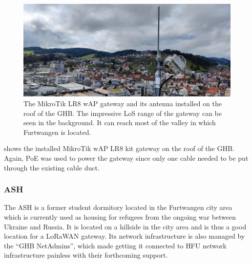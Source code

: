 \begin{figure}[htbp]
    \centering
    \includegraphics[width=1\textwidth]{pictures/hardware/gateway-deployment/lr8_ghb_installation.jpg}
    \caption{
        The MikroTik LR8 wAP gateway and its antenna installed on the roof of the \ac{GHB}.
        The impressive \ac{LoS} range of the gateway can be seen in the background.
        It can reach most of the valley in which Furtwangen is located.
    }\label{pic:mikrotik-gateway-ghb-installation}
\end{figure}

 shows the installed MikroTik wAP LR8 kit gateway on the roof of the \ac{GHB}.
Again, \ac{PoE} was used to power the gateway since only one cable needed to be put through the existing cable duct.

\subsubsection{\acf{ASH}}

The \ac{ASH} is a former student dormitory located in the Furtwangen city area which is currently used as housing for refugees from the ongoing war between Ukraine and Russia.
It is located on a hillside in the city area and is thus a good location for a \ac{LoRaWAN} gateway.
Its network infrastructure is also managed by the ``\ac{GHB} NetAdmins'', which made getting it connected to \ac{HFU} network infrastructure painless with their forthcoming support.

